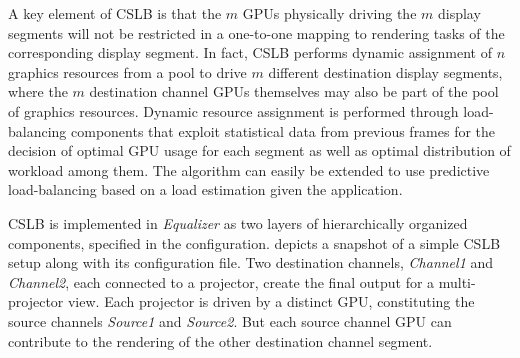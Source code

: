 A key element of CSLB is that the $m$ GPUs physically driving the $m$ display
segments will not be restricted in a one-to-one mapping to rendering tasks of
the corresponding display segment. In fact, CSLB performs dynamic assignment of
$n$ graphics resources from a pool to drive $m$ different destination display
segments, where the $m$ destination channel GPUs themselves may also be part of
the pool of graphics resources. Dynamic resource assignment is performed through
load-balancing components that exploit statistical data from previous frames for
the decision of optimal GPU usage for each segment as well as optimal
distribution of workload among them. The algorithm can easily be extended to use
predictive load-balancing based on a load estimation given the application.

CSLB is implemented in {\em Equalizer} as two layers of hierarchically organized
components, specified in the configuration.  depicts
a snapshot of a simple CSLB setup along with its configuration file. Two
destination channels, {\em Channel1} and {\em Channel2}, each connected to a
projector, create the final output for a multi-projector view. Each projector is
driven by a distinct GPU, constituting the source channels {\em Source1} and
{\em Source2}. But each source channel GPU can contribute to the rendering of
the other destination channel segment.

